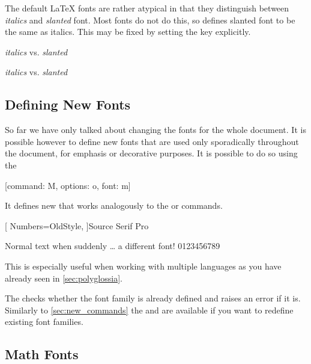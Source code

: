 The default \LaTeX{} fonts are rather atypical in that they distinguish between
\textit{italics} and \textsl{slanted} font. Most fonts do not do this, so
 defines slanted font to be the same as italics. This may be
fixed by setting the  key explicitly.
\begin{example}[vertical_mode, examplewidth=0.7\linewidth]
\setmainfont{Latin Modern Roman}
\textit{italics} vs. \textsl{slanted}

\setmainfont[
  SlantedFont=Latin Modern Roman Slanted,
]{Latin Modern Roman}
\textit{italics} vs. \textsl{slanted}
\end{example}

\subsection{Defining New Fonts}

So far we have only talked about changing the fonts for the whole document. It
is possible however to define new fonts that are used only sporadically
throughout the document, for emphasis or decorative purposes. It is possible to
do so using the
\begin{lscommand}
  [command: M, options: o, font: m]
\end{lscommand}
It defines new  that works analogously to the  or
 commands.
\begin{example}
\newfontfamily{\sourcefamily}[
  Numbers=OldStyle,
]{Source Serif Pro}

Normal text when suddenly
\ldots{} \sourcefamily
a different font! 0123456789
\end{example}
This is especially useful when working with multiple languages as you have
already seen in \autoref{sec:polyglossia}.

The  checks whether the font family is already defined and
raises an error if it is. Similarly to \autoref{sec:new_commands} the
 and  are available if you want to
redefine existing font families.

\subsection{Math Fonts}\label{sec:math_fonts}

